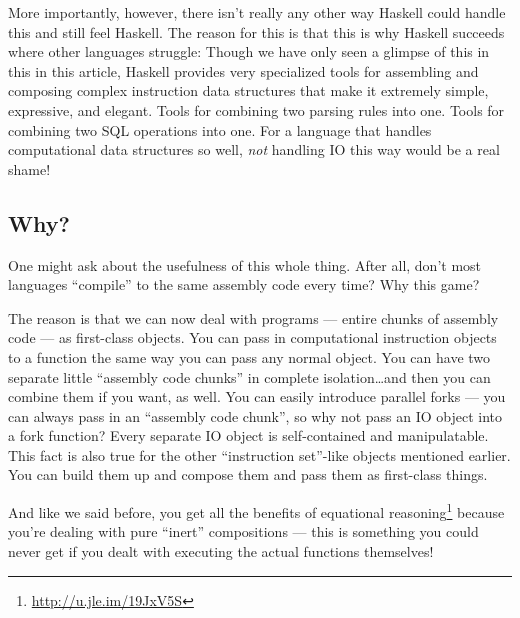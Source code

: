 \documentclass[]{article}
\renewcommand{\href}[2]{#2\footnote{\url{#1}}}
\begin{document}
More importantly, however, there isn't really any other way Haskell could handle this and still feel
Haskell. The reason for this is that this is why Haskell succeeds where other languages struggle:
Though we have only seen a glimpse of this in this in this article, Haskell provides very
specialized tools for assembling and composing complex instruction data structures that make it
extremely simple, expressive, and elegant. Tools for combining two parsing rules into one. Tools for
combining two SQL operations into one. For a language that handles computational data structures so
well, \emph{not} handling IO this way would be a real shame!

\subsection{Why?}\label{why}

One might ask about the usefulness of this whole thing. After all, don't most languages ``compile''
to the same assembly code every time? Why this game?

The reason is that we can now deal with programs --- entire chunks of assembly code --- as
first-class objects. You can pass in computational instruction objects to a function the same way
you can pass any normal object. You can have two separate little ``assembly code chunks'' in
complete isolation\ldots{}and then you can combine them if you want, as well. You can easily
introduce parallel forks --- you can always pass in an ``assembly code chunk'', so why not pass an
IO object into a fork function? Every separate IO object is self-contained and manipulatable. This
fact is also true for the other ``instruction set''-like objects mentioned earlier. You can build
them up and compose them and pass them as first-class things.

And like we said before, you get all the benefits of \href{http://u.jle.im/19JxV5S}{equational
reasoning} because you're dealing with pure ``inert'' compositions --- this is something you could
never get if you dealt with executing the actual functions themselves!
\end{document}
